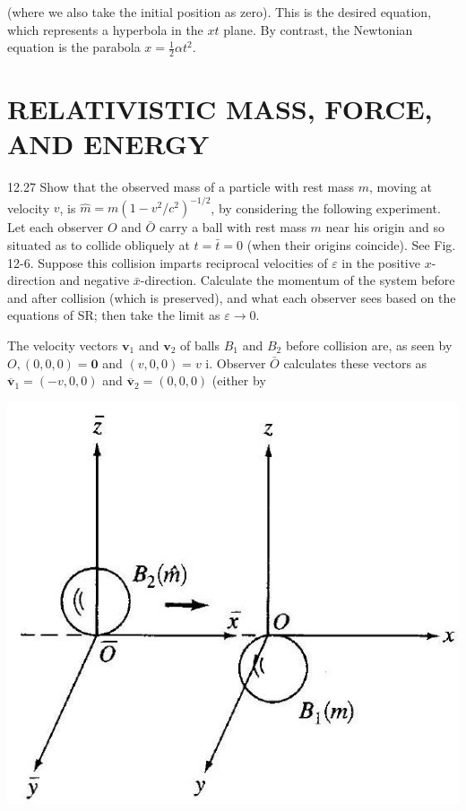 \documentclass[10pt]{article}
\begin{document}
(where we also take the initial position as zero). This is the desired equation, which represents a hyperbola in the $x t$ plane. By contrast, the Newtonian equation is the parabola $x=\frac{1}{2} \alpha t^{2}$.

\section*{RELATIVISTIC MASS, FORCE, AND ENERGY}
12.27 Show that the observed mass of a particle with rest mass $m$, moving at velocity $v$, is $\hat{m}=m\left(1-v^{2} / c^{2}\right)^{-1 / 2}$, by considering the following experiment. Let each observer $O$ and $\bar{O}$ carry a ball with rest mass $m$ near his origin and so situated as to collide obliquely at $t=\bar{t}=0$ (when their origins coincide). See Fig. 12-6. Suppose this collision imparts reciprocal velocities of $\varepsilon$ in the positive $x$-direction and negative $\bar{x}$-direction. Calculate the momentum of the system before and after collision (which is preserved), and what each observer sees based on the equations of SR; then take the limit as $\varepsilon \rightarrow 0$.

The velocity vectors $\mathbf{v}_{1}$ and $\mathbf{v}_{2}$ of balls $B_{1}$ and $B_{2}$ before collision are, as seen by $O,(0,0,0)=\mathbf{0}$ and $(v, 0,0)=v$ i. Observer $\bar{O}$ calculates these vectors as $\overline{\mathbf{v}}_{1}=(-v, 0,0)$ and $\overline{\mathbf{v}}_{2}=(0,0,0)$ (either by

\begin{center}
\includegraphics[max width=\textwidth]{2024_04_03_41f90be4f896e21f0dc9g-192}
\end{center}
\end{document}
